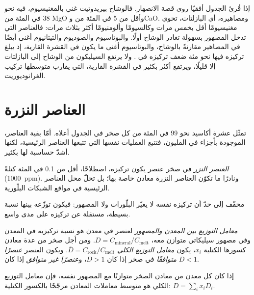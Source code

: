 إذا قُرئ الجدول أفقيًا روى قصة الانصهار. فالوشاح بيريدوتيت غني
بالمغنيسيوم، فيه نحو 38 في المئة من MgO وأقل من 5 في المئة من  وCaO.
ومصاهيره، أي البازلتات، تحوي مغنيسيومًا أقل بخمس مرات وكالسيومًا وألومنيومًا
أكثر بثلاث مرات: فالعناصر التي تدخل المصهور بسهولة تغادر الوشاح
أولًا. والبوتاسيوم والصوديوم والتيتانيوم أغنى أيضًا في المصاهير مقارنةً
بالوشاح، والبوتاسيوم أغنى ما يكون في القشرة القارية،
إذ يبلغ تركيزه فيها نحو مئة ضعف تركيزه في . ولا يرتفع السيليكون
من الوشاح إلى البازلتات إلا قليلًا، ويرتفع أكثر بكثير في القشرة
القارية، التي يقارب متوسطها تركيب الغرانوديوريت.

\section{العناصر النزرة}

تمثّل عشرة أكاسيد نحو 99 في المئة من كل صخر في الجدول أعلاه. أمّا بقية العناصر،
الموجودة بأجزاء في المليون، فتتبع العمليات نفسها التي تتبعها العناصر الرئيسية، لكنها
أشدّ حساسية لها بكثير.

\begin{definition}\label{def:b2:elements-in-the-earth:trace}
\emph{العنصر النزر} في صخر عنصر يكون
تركيزه، اصطلاحًا، أقل من 0.1 في المئة كتلةً (\qty{1000}{ppm}).
ونادرًا ما تكوّن العناصر النزرة معادن خاصة بها؛ بل تحلّ محل العناصر
الرئيسية في مواقع الشبكات البلّورية.
\end{definition}

 مخفّف إلى حدّ أن تركيزه نفسه لا يغيّر
البلّورات ولا المصهور: فيكون توزّعه بينها نسبة بسيطة،
مستقلة عن تركيزه على مدى واسع.

\begin{definition}\label{def:b2:elements-in-the-earth:partition}
\emph{معامل التوزيع بين المعدن والمصهور}
لعنصر في معدن هو نسبة تركيزيه في
المعدن وفي مصهور سيليكاتي متوازن معه،
$D = C_{\mathrm{mineral}}/C_{\mathrm{melt}}$. ومن أجل صخر من عدة معادن
كسورها الكتلية $x_i$، يكون \emph{معامل التوزيع الكلي}
$\bar D = C_{\mathrm{rock}}/C_{\mathrm{melt}}$. ويكون العنصر
\emph{عنصرًا متوافقًا} في صخر إذا كان $\bar D > 1$،
و\emph{عنصرًا غير متوافق} إذا كان $\bar D < 1$.
\end{definition}

\begin{proposition}
\label{prop:b2:elements-in-the-earth:bulk-d}
إذا كان كل معدن من معادن الصخر متوازنًا مع المصهور نفسه، فإن معامل التوزيع
الكلي هو متوسط معاملات المعادن مرجّحًا
بالكسور الكتلية: $\bar D = \sum_i x_i D_i$.
\end{proposition}

